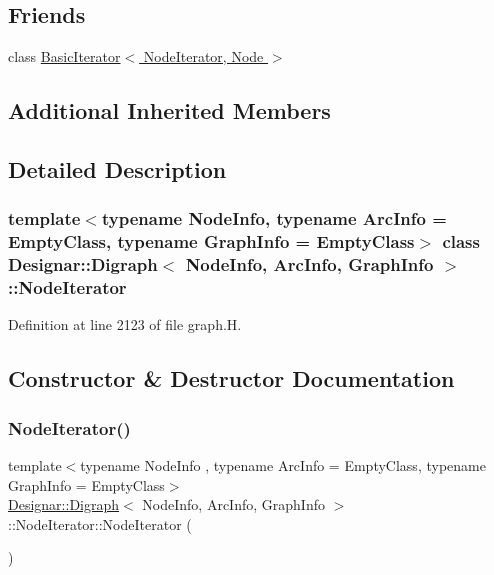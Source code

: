\subsection*{Friends}
\begin{DoxyCompactItemize}
\item 
class \hyperlink{class_designar_1_1_digraph_1_1_node_iterator_a21dc6ae614d097ff896e9e8e422d8f3c}{Basic\+Iterator$<$ Node\+Iterator, Node $>$}
\end{DoxyCompactItemize}
\subsection*{Additional Inherited Members}


\subsection{Detailed Description}
\subsubsection*{template$<$typename Node\+Info, typename Arc\+Info = Empty\+Class, typename Graph\+Info = Empty\+Class$>$\newline
class Designar\+::\+Digraph$<$ Node\+Info, Arc\+Info, Graph\+Info $>$\+::\+Node\+Iterator}



Definition at line 2123 of file graph.\+H.



\subsection{Constructor \& Destructor Documentation}
\mbox{\label{class_designar_1_1_digraph_1_1_node_iterator_a53d6530188cf6c4ed6d2b2b114af9967}} 
\subsubsection{\texorpdfstring{Node\+Iterator()}{NodeIterator()}\hspace{0.1cm}{\footnotesize\ttfamily [1/5]}}
{\footnotesize\ttfamily template$<$typename Node\+Info , typename Arc\+Info  = Empty\+Class, typename Graph\+Info  = Empty\+Class$>$ \\
\hyperlink{class_designar_1_1_digraph}{Designar\+::\+Digraph}$<$ Node\+Info, Arc\+Info, Graph\+Info $>$\+::Node\+Iterator\+::\+Node\+Iterator (\begin{DoxyParamCaption}{ }\end{DoxyParamCaption})\hspace{0.3cm}{\ttfamily [inline]}}



